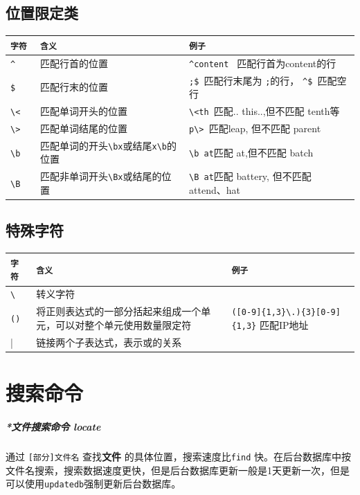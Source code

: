 \documentclass[UTF8,a4paper,12pt]{ctexbook}
\begin{document}
		\subsection{位置限定类}
			\begin{table}[H]
					\centering
				\begin{tabular}{l|m{8cm}|m{7cm}}
					\hline
						\verb|字符 |   	   & \verb|含义| & \verb|例子|\\
					\hline
						\verb|^ |   	   & 匹配行首的位置 & 	\verb|^content | 匹配行首为content的行\\
						\verb|$ |   	   & 匹配行末的位置 &  \verb|;$ |匹配行末尾为 \verb|;|的行， \verb|^$ |匹配空行\\
						\verb|\<|   	   & 匹配单词开头的位置 & \verb|\<th |匹配.. this..,但不匹配 tenth等 \\
						\verb|\>|   	   & 匹配单词结尾的位置 & \verb|p\> |匹配leap, 但不匹配 parent\\
						\verb|\b|	  	   & 匹配单词的开头\verb|\bx|或结尾\verb|x\b|的位置 & \verb|\b at|匹配 at,但不匹配 batch\\
						\verb|\B|   	   & 匹配非单词开头\verb|\Bx|或结尾的位置 & \verb|\B at|匹配 battery, 但不匹配 attend、hat\\
					\hline
				\end{tabular}
			\end{table}
		
		\subsection{特殊字符}
			\begin{table}[H]
				\centering
				\begin{tabular}{l|m{8cm}|m{7cm}}
					\hline
					\verb|字符 |   	   & \verb|含义| & \verb|例子|\\
					\hline
					\verb|\ |   	   & 转义字符  & 	\\
					\verb|() |   	   & 将正则表达式的一部分括起来组成一个单元，可以对整个单元使用数量限定符&  \verb|([0-9]{1,3}\.){3}[0-9]{1,3}| 匹配IP地址\\
					|   	   & 链接两个子表达式，表示或的关系 &  \\
					\hline
				\end{tabular}
			\end{table}		
	\section{搜索命令}
		\subparagraph{*文件搜索命令 locate} 通过 \verb|[部分]文件名| 查找\textbf{文件} 的具体位置，搜索速度比\verb|find| 快。在后台数据库中按文件名搜索，搜索数据速度更快，但是后台数据库更新一般是1天更新一次，但是可以使用\verb|updatedb|强制更新后台数据库。
		
\end{document}

